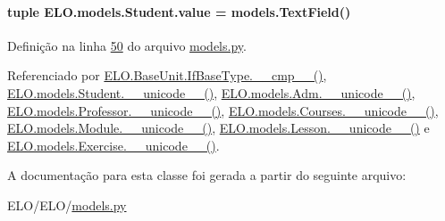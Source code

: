 \hypertarget{classELO_1_1models_1_1Student_a201226779dce6e064cb16bd92ed016e2}{
\paragraph[{value}]{\setlength{\rightskip}{0pt plus 5cm}tuple E\-L\-O.\-models.\-Student.\-value = models.\-Text\-Field()\hspace{0.3cm}{\ttfamily [static]}}}\label{classELO_1_1models_1_1Student_a201226779dce6e064cb16bd92ed016e2}


Definição na linha \hyperlink{ELO_2models_8py_source_l00050}{50} do arquivo \hyperlink{ELO_2models_8py_source}{models.\-py}.



Referenciado por \hyperlink{classELO_1_1BaseUnit_1_1IfBaseType_a69c338f6f1574bd3524e9d59ebc17a7c}{E\-L\-O.\-Base\-Unit.\-If\-Base\-Type.\-\_\-\-\_\-cmp\-\_\-\-\_\-()}, \hyperlink{classELO_1_1models_1_1Student_a2f51785c1beb3b45269a8678d97ec783}{E\-L\-O.\-models.\-Student.\-\_\-\-\_\-unicode\-\_\-\-\_\-()}, \hyperlink{classELO_1_1models_1_1Adm_a3541c3ae12b8d2da3f44ac6be00a23e6}{E\-L\-O.\-models.\-Adm.\-\_\-\-\_\-unicode\-\_\-\-\_\-()}, \hyperlink{classELO_1_1models_1_1Professor_aefc9d63d429e19ec3487a7879879f29d}{E\-L\-O.\-models.\-Professor.\-\_\-\-\_\-unicode\-\_\-\-\_\-()}, \hyperlink{classELO_1_1models_1_1Courses_a8926a37152be8d4fc3e0ba6af200f871}{E\-L\-O.\-models.\-Courses.\-\_\-\-\_\-unicode\-\_\-\-\_\-()}, \hyperlink{classELO_1_1models_1_1Module_a1b54aa7a5e8dac090dea0926eca5550d}{E\-L\-O.\-models.\-Module.\-\_\-\-\_\-unicode\-\_\-\-\_\-()}, \hyperlink{classELO_1_1models_1_1Lesson_a3d9f0295dbe1ed5c74668d6c0876f97c}{E\-L\-O.\-models.\-Lesson.\-\_\-\-\_\-unicode\-\_\-\-\_\-()} e \hyperlink{classELO_1_1models_1_1Exercise_af3e991e5610cec815a2c3260ec6aae0b}{E\-L\-O.\-models.\-Exercise.\-\_\-\-\_\-unicode\-\_\-\-\_\-()}.



A documentação para esta classe foi gerada a partir do seguinte arquivo\-:\begin{DoxyCompactItemize}
\item 
E\-L\-O/\-E\-L\-O/\hyperlink{ELO_2models_8py}{models.\-py}\end{DoxyCompactItemize}
